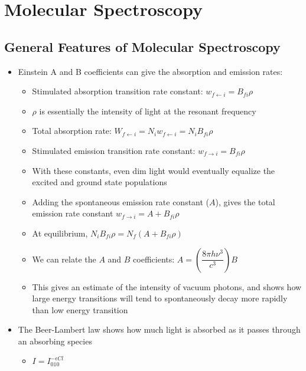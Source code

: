 \documentclass[12pt, openany, letterpaper]{memoir}
\begin{document}
\chapter{Molecular Spectroscopy}
\section{General Features of Molecular Spectroscopy}
\begin{itemize}
	\item Einstein A and B coefficients can give the absorption and emission rates:
	\begin{itemize}
		\item Stimulated absorption transition rate constant: $w_{f\leftarrow i}=B_{fi}\rho$
		\item $\rho$ is essentially the intensity of light at the resonant frequency
		\item Total absorption rate: $W_{f\leftarrow i} = N_iw_{f\leftarrow i}=N_iB_{fi}\rho$
		\item Stimulated emission transition rate constant: $w_{f\rightarrow i}=B_{fi}\rho$
		\item With these constants, even dim light would eventually equalize the excited and ground state populations
		\item Adding the spontaneous emission rate constant ($A$), gives the total emission rate constant $w_{f\rightarrow i}=A+B_{fi}\rho$
		\item At equilibrium, $N_iB_{fi}\rho=N_f\left(A+B_{fi}\rho\right)$
		\item We can relate the $A$ and $B$ coefficients: $A=\left(\dfrac{8\pi h\nu^3}{c^3}\right)B$
		\item This gives an estimate of the intensity of vacuum photons, and shows how large energy transitions will tend to spontaneously decay more rapidly than low energy transition
	\end{itemize}	
	\item The Beer-Lambert law shows how much light is absorbed as it passes through an absorbing species
	\begin{itemize}
		\item $I=I_010^{-\epsilon C l}$ 
		

\end{itemize}
\end{itemize}
\end{document}
